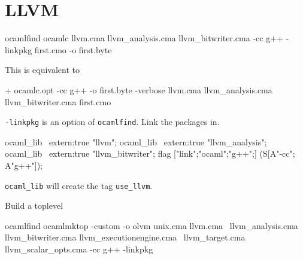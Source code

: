\section{LLVM}

\begin{bashcode}
ocamlfind ocamlc llvm.cma llvm_analysis.cma llvm_bitwriter.cma -cc g++ -linkpkg first.cmo -o first.byte
\end{bashcode}
This is equivalent to
\begin{bashcode}
+ ocamlc.opt -cc g++ -o first.byte -verbose llvm.cma llvm_analysis.cma llvm_bitwriter.cma first.cmo
\end{bashcode}

\verb|-linkpkg| is an option of \verb|ocamlfind|. Link the packages in.


\begin{ocamlcode}
  ocaml_lib ~extern:true "llvm";
  ocaml_lib ~extern:true "llvm_analysis";
  ocaml_lib ~extern:true "llvm_bitwriter";
  flag ["link";"ocaml";"g++";] (S[A"-cc"; A"g++"]);
\end{ocamlcode}
\verb|ocaml_lib| will create the tag \verb|use_llvm|.


Build a toplevel 

\begin{ocamlcode}
ocamlfind ocamlmktop -custom -o olvm unix.cma llvm.cma \
llvm_analysis.cma llvm_bitwriter.cma  llvm_executionengine.cma \
llvm_target.cma llvm_scalar_opts.cma -cc g++ -linkpkg
\end{ocamlcode}
